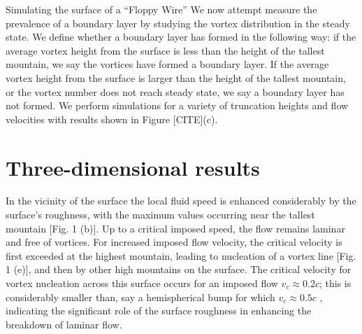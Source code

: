 \begin{chapter}{\label{cha:afm}Simulating the surface of a ``Floppy Wire''}
We now attempt measure the prevalence of a boundary layer by studying the vortex distribution in the steady state. We define whether a boundary layer has formed in the following way: if the average vortex height from the surface is less than the height of the tallest mountain, we say the vortices have formed a boundary layer. If the average vortex height from the surface is larger than the height of the tallest mountain, or the vortex number does not reach steady state, we say a boundary layer has not formed. We perform simulations for a variety of truncation heights and flow velocities with results shown in Figure [CITE](c).



 
\section{Three-dimensional results}
{In the vicinity of the surface the local fluid speed} is enhanced considerably by the {surface's} roughness, 
with the maximum values occurring near the tallest mountain [Fig. 1 (b)].   Up to a critical imposed speed, the flow remains laminar and free of vortices.  For increased imposed flow velocity, the critical velocity is first exceeded at the highest mountain, leading to nucleation of a vortex line [Fig. 1 (e)], and then by other high mountains on the surface.  The critical velocity for vortex nucleation across this surface occurs for an imposed flow $v_c\approx 0.2 c$; this is considerably smaller than, say a hemispherical bump for which $v_c \approx 0.5 c$ \cite{winiecki},  indicating the significant role of the surface roughness in enhancing the breakdown of laminar flow.  


\end{chapter}
